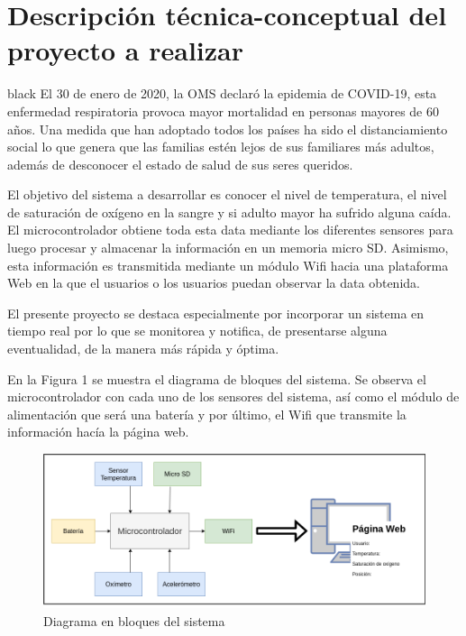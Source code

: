 \documentclass[11pt]{charter}
\begin{document}
\section{Descripción técnica-conceptual del proyecto a realizar}
\label{sec:descripcion}

\begin{consigna}{black}
El 30 de enero de 2020, la OMS declaró la epidemia de COVID-19, esta enfermedad respiratoria provoca mayor mortalidad en personas mayores de 60 años. Una medida que han adoptado todos los países ha sido el distanciamiento social lo que genera que las familias estén lejos de sus familiares más adultos, además de desconocer el estado de salud de sus seres queridos. 

El objetivo del sistema a desarrollar es conocer el nivel de temperatura, el nivel de saturación de oxígeno en la sangre y si adulto mayor ha sufrido alguna caída. El microcontrolador obtiene toda esta data mediante los diferentes sensores para luego procesar y almacenar la información en un memoria micro SD. Asimismo, esta información es transmitida mediante un módulo Wifi hacia una plataforma Web en la que el usuarios o los usuarios puedan observar la data obtenida. 

El presente proyecto se destaca especialmente por incorporar un sistema en tiempo real por lo que se monitorea y notifica, de presentarse alguna eventualidad, de la manera más rápida y óptima. 

En la Figura 1 se muestra el diagrama de bloques del sistema. Se observa el microcontrolador con cada uno de los sensores del sistema, así como  el módulo de alimentación que será una batería y por último, el Wifi que transmite la información hacía la página web.

\vspace{25px}

\begin{figure}[htpb]
\centering 
\includegraphics[width=1\textwidth]{./Figuras/diagBloques.png}
\caption{Diagrama en bloques del sistema}
\label{fig:diagBloques}
\end{figure}


\end{consigna}
\end{document}
